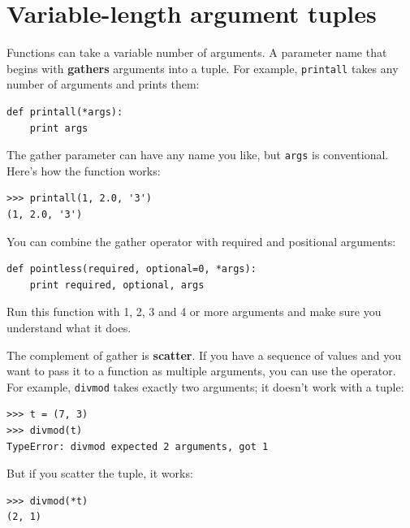 

\section{Variable-length argument tuples}


Functions can take a variable number of arguments.  A parameter
name that begins with {\tt *} {\bf gathers} arguments into
a tuple.  For example, {\tt printall}
takes any number of arguments and prints them:

\beforeverb
\begin{verbatim}
def printall(*args):
    print args
\end{verbatim}
\afterverb
%
The gather parameter can have any name you like, but {\tt args} is
conventional.  Here's how the function works:

\beforeverb
\begin{verbatim}
>>> printall(1, 2.0, '3')
(1, 2.0, '3')
\end{verbatim}
\afterverb
%
You can combine the gather operator with required and positional
arguments:

\beforeverb
\begin{verbatim}
def pointless(required, optional=0, *args):
    print required, optional, args
\end{verbatim}
\afterverb
%
Run this function with 1, 2, 3 and 4 or more arguments and
make sure you understand what it does.


The complement of gather is {\bf scatter}.  If you have a
sequence of values and you want to pass it to a function
as multiple arguments, you can use the {\tt *} operator.
For example, {\tt divmod} takes exactly two arguments; it
doesn't work with a tuple:


\beforeverb
\begin{verbatim}
>>> t = (7, 3)
>>> divmod(t)
TypeError: divmod expected 2 arguments, got 1
\end{verbatim}
\afterverb
%
But if you scatter the tuple, it works:

\beforeverb
\begin{verbatim}
>>> divmod(*t)
(2, 1)
\end{verbatim}
\afterverb
%

